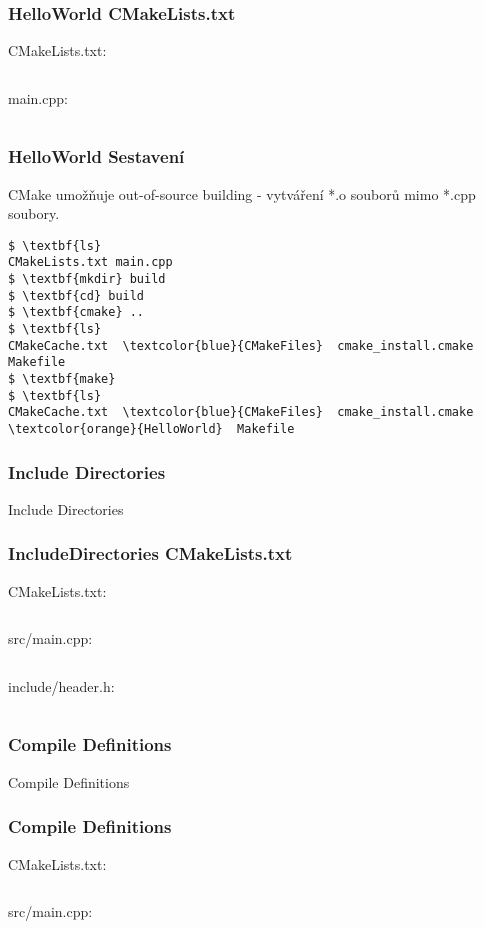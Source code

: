 \begin{frame}[fragile]
\frametitle{HelloWorld CMakeLists.txt}
CMakeLists.txt:
\inputminted[frame=lines]{cmake}{../examples/01-HellowWorld/CMakeLists.txt}
main.cpp:
\inputminted[frame=lines]{c++}{../examples/01-HellowWorld/main.cpp}
\end{frame}

\begin{frame}[fragile]
\frametitle{HelloWorld Sestavení}
CMake umožňuje out-of-source building - vytváření *.o souborů mimo *.cpp soubory.
{\small
\begin{Verbatim}[commandchars=\\\{\}]
$ \textbf{ls}
CMakeLists.txt main.cpp
$ \textbf{mkdir} build
$ \textbf{cd} build
$ \textbf{cmake} ..
$ \textbf{ls}
CMakeCache.txt  \textcolor{blue}{CMakeFiles}  cmake_install.cmake  Makefile
$ \textbf{make}
$ \textbf{ls}
CMakeCache.txt  \textcolor{blue}{CMakeFiles}  cmake_install.cmake  \textcolor{orange}{HelloWorld}  Makefile
\end{Verbatim}
}
\end{frame}

\begin{frame}
\frametitle{Include Directories}
\begin{center}
\Huge {\color{white}Include Directories}
\end{center}
\end{frame}

\begin{frame}[fragile]
\frametitle{IncludeDirectories CMakeLists.txt}
  CMakeLists.txt:
  {\scriptsize \inputminted[frame=lines]{cmake}{../examples/02-IncludeDirectories/CMakeLists.txt}}
  src/main.cpp:
  {\scriptsize \inputminted[frame=lines]{c++}{../examples/02-IncludeDirectories/src/main.cpp}}
  include/header.h:
  {\scriptsize \inputminted[frame=lines]{c++}{../examples/02-IncludeDirectories/include/header.h}}
\end{frame}

\begin{frame}
\frametitle{Compile Definitions}
\begin{center}
\Huge {\color{white}Compile Definitions}
\end{center}
\end{frame}

\begin{frame}[fragile]
\frametitle{Compile Definitions}
  CMakeLists.txt:
  {\scriptsize \inputminted[frame=lines]{cmake}{../examples/03-CompileDefinitions/CMakeLists.txt}}
  src/main.cpp:
  {\scriptsize \inputminted[frame=lines]{c++}{../examples/03-CompileDefinitions/main.cpp}}
\end{frame}

